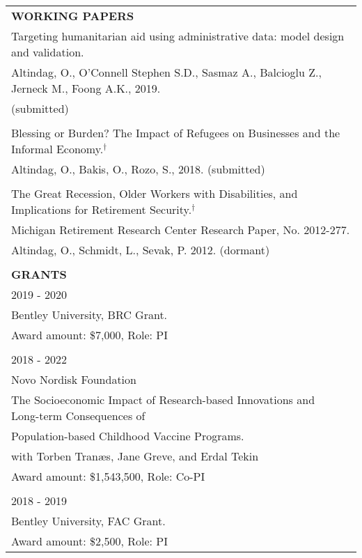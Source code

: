 \documentclass[12 pt]{article}
\begin{document}
\begin{longtable}{ccccc}
\\


\multicolumn{5}{l}{\textbf{WORKING PAPERS}}\\[2 pt]

 \multicolumn{5}{l}{Targeting humanitarian aid using administrative data: model design and validation.} \\ 
  \multicolumn{5}{l}{Altindag, O., O'Connell Stephen S.D., Sasmaz A., Balcioglu Z., Jerneck M., Foong A.K., 2019.} \\
\multicolumn{5}{l}{(submitted)} \\ 
 
\\
  \multicolumn{5}{l}{Blessing or Burden? The Impact of Refugees on Businesses and the Informal Economy.$^{\dagger}$} \\

  \multicolumn{5}{l}{Altindag, O., Bakis, O., Rozo, S., 2018. (submitted)} \\
  




\\






\multicolumn{5}{l}{The Great Recession, Older Workers with Disabilities, and Implications for Retirement Security.$^{\dagger}$} \\
\multicolumn{5}{l}{Michigan Retirement Research Center Research Paper, No. 2012-277.} \\
\multicolumn{5}{l}{Altindag, O., Schmidt, L., Sevak, P. 2012. (dormant) } \\
\\


  \multicolumn{5}{l}{\textbf{GRANTS}}\\[2 pt]
 \multicolumn{4}{l}{2019 - 2020} \\  
  \multicolumn{4}{l}{Bentley University, BRC Grant.} \\
\multicolumn{4}{l}{Award amount: \$7,000, Role: PI}  \\
\\  
 \multicolumn{4}{l}{2018 - 2022} \\
 \multicolumn{4}{l}{Novo Nordisk Foundation}  \\
\multicolumn{4}{l}{The Socioeconomic Impact of Research-based Innovations and Long-term Consequences of}  \\
  \multicolumn{4}{l}{Population-based Childhood Vaccine Programs.} \\
  \multicolumn{4}{l}{with Torben Tran{\ae}s, Jane Greve, and Erdal Tekin}  \\
  \multicolumn{4}{l}{Award amount: \$1,543,500, Role: Co-PI  }  \\
  \\
 \multicolumn{4}{l}{2018 - 2019} \\
 \multicolumn{4}{l}{Bentley University, FAC Grant.} \\
\multicolumn{4}{l}{Award amount: \$2,500, Role: PI}  \\


\end{longtable}
\end{document}
